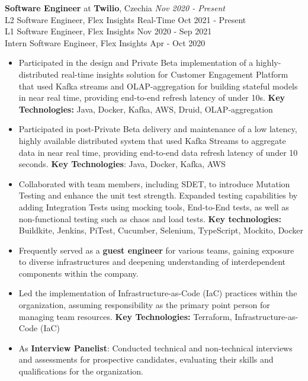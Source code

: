 
{\textbf{Software Engineer} at \textbf{Twilio}, Czechia} 
    \hfill {\em Nov 2020 - Present}\\
    {L2 Software Engineer, Flex Insights Real-Time} \hfill  {Oct 2021 - Present}\\
    {L1 Software Engineer, Flex Insights} \hfill            {Nov 2020 - Sep 2021}\\
    {Intern Software Engineer, Flex Insights} \hfill        {Apr - Oct 2020}
    \begin{itemize}
        \item Participated in the design and Private Beta implementation of a highly-distributed real-time insights solution for Customer Engagement Platform that used Kafka streams and OLAP-aggregation for building stateful models in near real time, providing end-to-end refresh latency of under 10s. \textbf{Key Technologies:} Java, Docker, Kafka, AWS, Druid, OLAP-aggregation
        \item Participated in post-Private Beta delivery and maintenance of a low latency, highly available distributed system that used Kafka Streams to aggregate data in near real time, providing end-to-end data refresh latency of under 10 seconds. \textbf{Key Technologies}: Java, Docker, Kafka, AWS
        \item Collaborated with team members, including SDET, to introduce Mutation Testing and enhance the unit test strength. Expanded testing capabilities by adding Integration Tests using mocking tools, End-to-End tests, as well as non-functional testing such as chaos and load tests. \textbf{Key technologies:} Buildkite, Jenkins, PiTest, Cucumber, Selenium, TypeScript, Mockito, Docker
        \item Frequently served as a \textbf{guest engineer} for various teams, gaining exposure to diverse infrastructures and deepening understanding of interdependent components within the company.
        \item Led the implementation of Infrastructure-as-Code (IaC) practices within the organization, assuming responsibility as the primary point person for managing team resources. \textbf{Key Technologies:} Terraform, Infrastructure-as-Code (IaC)
        \item As \textbf{Interview Panelist}: Conducted technical and non-technical interviews and assessments for prospective candidates, evaluating their skills and qualifications for the organization.

\end{itemize}
